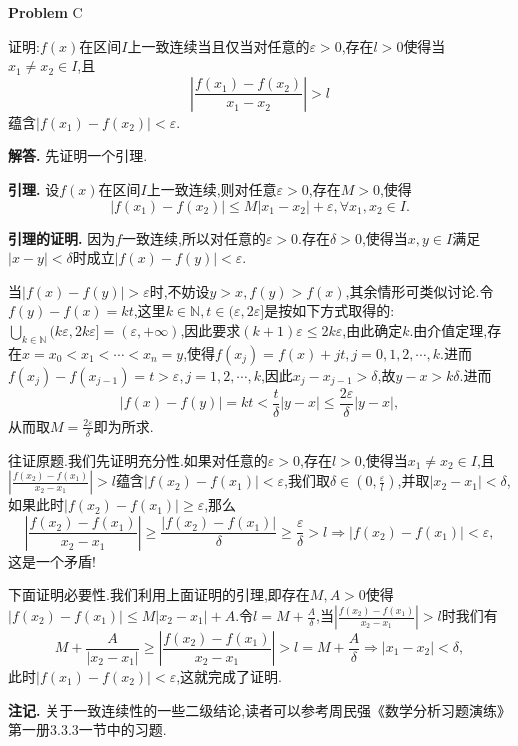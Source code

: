 \documentclass{article}
\newcounter{problemname}
\newenvironment{problem}{\begin{shaded}\stepcounter{problemname}\par\noindent\textbf{Problem }}{\end{shaded}\par}
\newenvironment{solution}{\par\noindent\textbf{解答. }}{\par}
\newenvironment{lemma}{\par\noindent\textbf{引理. }}{\par}
\newenvironment{lemmaproof}{\par\noindent\textbf{引理的证明. }}{\par}
\newenvironment{note}{\par\noindent\textbf{注记. }}{\par}
\begin{document}
\begin{problem}{C}\par
证明:$f(x)$在区间$I$上一致连续当且仅当对任意的$\varepsilon>0$,存在$l>0$使得当$x_1\ne x_2\in I$,且
$$
\left| \frac{f\left( x_1 \right) -f\left( x_2 \right)}{x_1-x_2} \right|>l
$$
蕴含$|f(x_1)-f(x_2)|<\varepsilon$.
\end{problem}
\begin{solution}
先证明一个引理.
\begin{lemma}
设$f(x)$在区间$I$上一致连续,则对任意$\varepsilon>0$,存在$M>0$,使得
$$|f(x_1)-f(x_2)|\le M|x_1-x_2|+\varepsilon,\forall x_1,x_2\in I.$$
\end{lemma}
\begin{lemmaproof}
因为$f$一致连续,所以对任意的$\varepsilon>0$.存在$\delta>0$,使得当$x,y\in I$满足$|x-y|<\delta$时成立$|f(x)-f(y)|<\varepsilon$.\par
当$|f(x)-f(y)|>\varepsilon$时,不妨设$y>x,f(y)>f(x)$,其余情形可类似讨论.令$f(y)-f(x)=kt$,这里$k\in\mathbb{N},t\in(\varepsilon,2\varepsilon]$是按如下方式取得的:$\bigcup_{k\in\mathbb{N}}(k\varepsilon,2k\varepsilon]=(\varepsilon,+\infty)$,因此要求$(k+1)\varepsilon\le 2k\varepsilon$,由此确定$k$.由介值定理,存在$x=x_0<x_1<\cdots<x_n=y$,使得$f(x_j)=f(x)+jt,j=0,1,2,\cdots,k$.进而$f(x_j)-f(x_{j-1})=t>\varepsilon,j=1,2,\cdots,k$,因此$x_j-x_{j-1}>\delta$,故$y-x>k\delta$.进而
$$
\left| f\left( x \right) -f\left( y \right) \right|=kt<\frac{t}{\delta}\left| y-x \right|\le \frac{2\varepsilon}{\delta}\left| y-x \right|,
$$
从而取$M=\frac{2\varepsilon}{\delta}$即为所求.
\end{lemmaproof}
往证原题.我们先证明充分性.如果对任意的$\varepsilon>0$,存在$l>0$,使得当$x_1\ne x_2\in I$,且$\left|\frac{f(x_2)-f(x_1)}{x_2-x_1}\right|>l$蕴含$|f(x_2)-f(x_1)|<\varepsilon$,我们取$\delta\in\left(0,\frac{\varepsilon}{l}\right)$,并取$|x_2-x_1|<\delta$,如果此时$|f(x_2)-f(x_1)|\ge\varepsilon$,那么
$$
\left| \frac{f\left( x_2 \right) -f\left( x_1 \right)}{x_2-x_1} \right|\ge \frac{\left| f\left( x_2 \right) -f\left( x_1 \right) \right|}{\delta}\ge \frac{\varepsilon}{\delta}>l\Rightarrow \left| f\left( x_2 \right) -f\left( x_1 \right) \right|<\varepsilon ,
$$
这是一个矛盾!\par
下面证明必要性.我们利用上面证明的引理,即存在$M,A>0$使得$|f(x_2)-f(x_1)|\le M|x_2-x_1|+A$.令$l=M+\frac{A}{\delta}$,当$\left|\frac{f(x_2)-f(x_1)}{x_2-x_1}\right|>l$时我们有
$$
M+\frac{A}{\left| x_2-x_1 \right|}\ge \left| \frac{f\left( x_2 \right) -f\left( x_1 \right)}{x_2-x_1} \right|>l=M+\frac{A}{\delta}\Rightarrow \left| x_1-x_2 \right|<\delta ,
$$
此时$|f(x_1)-f(x_2)|<\varepsilon$,这就完成了证明.
\end{solution}
\begin{note}
关于一致连续性的一些二级结论,读者可以参考周民强《数学分析习题演练》第一册3.3.3一节中的习题.
\end{note}
\end{document}
